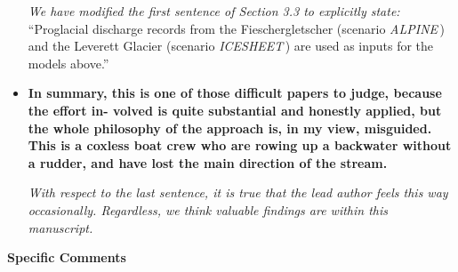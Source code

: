 \documentclass[11pt]{article}
\newcommand{\alpine}{\textit{ALPINE}\,}
\newcommand{\icesheet}{\textit{ICESHEET}\,}
\begin{document}
\begin{itemize}
  \textit{    We have modified the first sentence of Section 3.3 to explicitly state:}
    ``Proglacial discharge records from the Fieschergletscher (scenario \alpine{}) and the Leverett Glacier (scenario \icesheet{}) are used as inputs for the models above.''

\item \textbf{  In summary, this is one of those difficult papers to judge, because the effort in- volved is quite substantial and honestly applied, but the whole philosophy of the approach is, in my view, misguided. This is a coxless boat crew who are rowing up a backwater without a rudder, and have lost the main direction of the stream.}

  \textit{With respect to the last sentence, it is true that the lead author feels this way occasionally. Regardless, we think valuable findings are within this manuscript.}

\end{itemize}

\textbf{Specific Comments}
\end{document}
